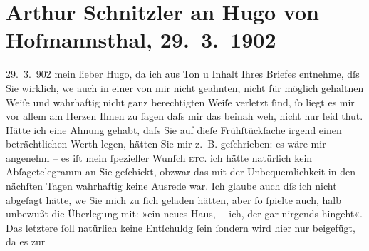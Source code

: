 

         
         \renewcommand{\erwaehntePersonen}{Personen: Hugo von Hofmannsthal, Malvine von Pollanetz}
         \renewcommand{\erwaehnteOrte}{Orte: Wien}
         \renewcommand{\erwaehnteWerke}{Werke: Über unsere Kraft. Zweiter Teil}
               \section[Arthur Schnitzler an Hugo von Hofmannsthal, 29. 3. 1902]{ Arthur Schnitzler an Hugo von Hofmannsthal, 29. 3. 1902}\nopagebreak{}\rehead{ }\begin{ledgroupsized}[t]{13cm}\normalsize\beginnumbering{} \toendnotes[C]{\smallbreak\pagebreak[2]} 
\pstart
           \raggedleft{}{\pb}29. 3. 902\pend
           \pstart
           mein lieber Hugo, da ich aus Ton u Inhalt Ihres Briefes entnehme,
               dſs Sie wirklich, we{\geminationn} auch in einer von mir nicht
               geahnten, nicht für möglich gehaltnen Weiſe und wahrhaftig nicht ganz berechtigten
               Weiſe verletzt ſind, ſo liegt es mir vor {\pb}allem am Herzen
               Ihnen zu ſagen daſs mir das beinah weh, nicht \introOben{}nur\introOben{} leid thut.
               Hätte ich eine Ahnung gehabt, daſs Sie auf dieſe Frühſtückſache irgend einen
               beträchtlichen Werth legen, hätten Sie mir z. B. geſchrieben: es wäre mir angenehm –
                  {\pb}es iſt mein ſpezieller Wunſch \textsc{etc}. ich hätte natürlich kein Abſagetelegramm an Sie geſchickt, obzwar das
               mit der Unbequemlichkeit in den nächſten Tagen wahrhaftig keine Ausrede war. Ich
               glaube auch dſs ich nicht abgeſagt hätte, we{\geminationn} Sie mich
               zu {\pb}ſich geladen hätten, aber ſo ſpielte auch, halb
               unbewußt die Überlegung mit: »ein neues Haus, – ich, der gar nirgends hingeht«. Das
               letztere ſoll natürlich keine Entſchuldg ſein ſondern \strikeout{\textcolor{gray}{aus}} wird hier nur beigefügt, da es zur

\end{ledgroupsized}
